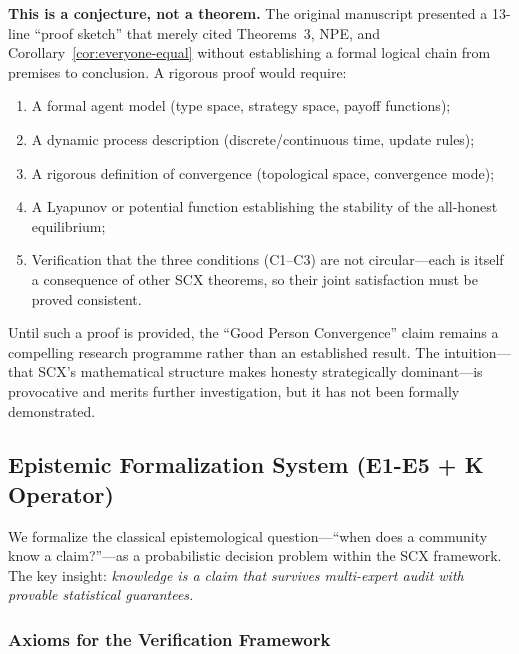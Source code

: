 \begin{remark}
\label{remark:good-convergence-status}
\textbf{This is a conjecture, not a theorem.} The original manuscript
presented a 13-line ``proof sketch'' that merely cited Theorems~3, NPE,
and Corollary~\ref{cor:everyone-equal} without establishing a formal
logical chain from premises to conclusion. A rigorous proof would require:
\begin{enumerate}[label=(\alph*)]
  \item A formal agent model (type space, strategy space, payoff functions);
  \item A dynamic process description (discrete/continuous time, update rules);
  \item A rigorous definition of convergence (topological space, convergence mode);
  \item A Lyapunov or potential function establishing the stability of the
    all-honest equilibrium;
  \item Verification that the three conditions (C1--C3) are not circular---each
    is itself a consequence of other SCX theorems, so their joint satisfaction
    must be proved consistent.
\end{enumerate}
Until such a proof is provided, the ``Good Person Convergence'' claim remains
a compelling research programme rather than an established result. The
intuition---that SCX's mathematical structure makes honesty strategically
dominant---is provocative and merits further investigation, but it has not
been formally demonstrated.
\end{remark}

\subsection{Epistemic Formalization System (E1-E5 + K Operator)}
\label{sec:epistemic}

We formalize the classical epistemological question---``when does a
community know a claim?''---as a probabilistic decision problem within
the SCX framework. The key insight: \emph{knowledge is a claim that
survives multi-expert audit with provable statistical guarantees.}

\subsubsection{Axioms for the Verification Framework}
\label{sec:epistemic-axioms}

